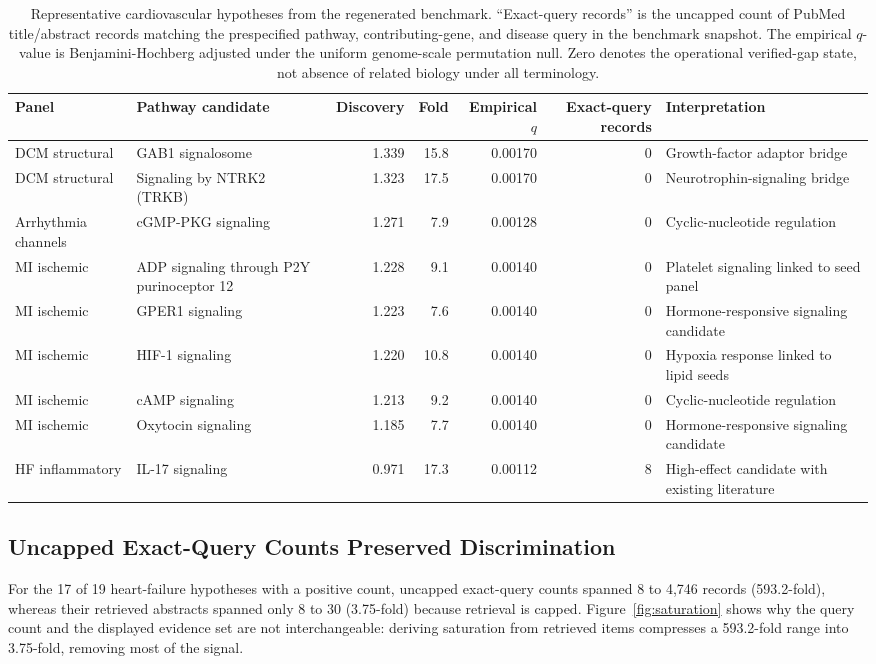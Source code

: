 \documentclass{ieeeaccess}
\begin{document}
\begin{table}[t]
\caption{Representative cardiovascular hypotheses from the regenerated benchmark. ``Exact-query records'' is the uncapped count of PubMed title/abstract records matching the prespecified pathway, contributing-gene, and disease query in the benchmark snapshot. The empirical $q$-value is Benjamini-Hochberg adjusted under the uniform genome-scale permutation null. Zero denotes the operational verified-gap state, not absence of related biology under all terminology.}
\label{tab:candidates}
\centering
\scriptsize
\setlength{\tabcolsep}{3pt}
\begin{tabular}{p{1.75cm}p{4.65cm}rrrrp{3.05cm}}
\toprule
Panel & Pathway candidate & Discovery & Fold & Empirical $q$ & Exact-query records & Interpretation \\
\midrule
DCM structural & GAB1 signalosome & 1.339 & 15.8 & 0.00170 & 0 & Growth-factor adaptor bridge \\
DCM structural & Signaling by NTRK2 (TRKB) & 1.323 & 17.5 & 0.00170 & 0 & Neurotrophin-signaling bridge \\
Arrhythmia channels & cGMP-PKG signaling & 1.271 & 7.9 & 0.00128 & 0 & Cyclic-nucleotide regulation \\
MI ischemic & ADP signaling through P2Y purinoceptor 12 & 1.228 & 9.1 & 0.00140 & 0 & Platelet signaling linked to seed panel \\
MI ischemic & GPER1 signaling & 1.223 & 7.6 & 0.00140 & 0 & Hormone-responsive signaling candidate \\
MI ischemic & HIF-1 signaling & 1.220 & 10.8 & 0.00140 & 0 & Hypoxia response linked to lipid seeds \\
MI ischemic & cAMP signaling & 1.213 & 9.2 & 0.00140 & 0 & Cyclic-nucleotide regulation \\
MI ischemic & Oxytocin signaling & 1.185 & 7.7 & 0.00140 & 0 & Hormone-responsive signaling candidate \\
HF inflammatory & IL-17 signaling & 0.971 & 17.3 & 0.00112 & 8 & High-effect candidate with existing literature \\
\bottomrule
\end{tabular}
\end{table}

\subsection{Uncapped Exact-Query Counts Preserved Discrimination}
For the 17 of 19 heart-failure hypotheses with a positive count, uncapped exact-query counts spanned 8 to 4,746 records (593.2-fold), whereas their retrieved abstracts spanned only 8 to 30 (3.75-fold) because retrieval is capped. Figure~\ref{fig:saturation} shows why the query count and the displayed evidence set are not interchangeable: deriving saturation from retrieved items compresses a 593.2-fold range into 3.75-fold, removing most of the signal.
\end{document}
